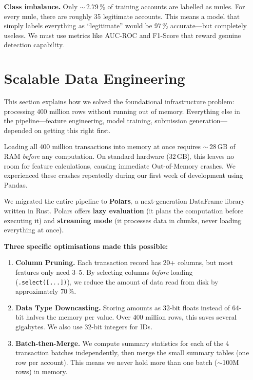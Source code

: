 \documentclass[11pt, a4paper]{article}
\begin{document}
\textbf{Class imbalance.}\quad
Only $\sim$\,2.79\,\% of training accounts are labelled as mules. For every mule, there are
roughly 35 legitimate accounts. This means a model that simply labels everything as
``legitimate'' would be 97\,\% accurate---but completely useless. We must use metrics like
AUC-ROC and F1-Score that reward genuine detection capability.


\section{Scalable Data Engineering}

This section explains how we solved the foundational infrastructure problem: processing 400
million rows without running out of memory. Everything else in the pipeline---feature
engineering, model training, submission generation---depended on getting this right first.

\begin{challengebox}
Loading all 400 million transactions into memory at once requires $\sim$\,28\,GB of RAM
\emph{before} any computation. On standard hardware (32\,GB), this leaves no room for
feature calculations, causing immediate Out-of-Memory crashes. We experienced these crashes
repeatedly during our first week of development using Pandas.
\end{challengebox}

\begin{solutionbox}
We migrated the entire pipeline to \textbf{Polars}, a next-generation DataFrame library
written in Rust. Polars offers \textbf{lazy evaluation} (it plans the computation before
executing it) and \textbf{streaming mode} (it processes data in chunks, never loading
everything at once).
\end{solutionbox}

\textbf{Three specific optimisations made this possible:}

\begin{enumerate}[leftmargin=1.5em, itemsep=6pt]
    \item \textbf{Column Pruning.}\quad
          Each transaction record has 20+ columns, but most features only need 3--5.
          By selecting columns \emph{before} loading (\texttt{.select([...])}), we reduce
          the amount of data read from disk by approximately 70\,\%.

    \item \textbf{Data Type Downcasting.}\quad
          Storing amounts as 32-bit floats instead of 64-bit halves the memory per value.
          Over 400 million rows, this saves several gigabytes. We also use 32-bit integers
          for IDs.

    \item \textbf{Batch-then-Merge.}\quad
          We compute summary statistics for each of the 4 transaction batches independently,
          then merge the small summary tables (one row per account). This means we never hold
          more than one batch ($\sim$100M rows) in memory.
\end{enumerate}
\end{document}
